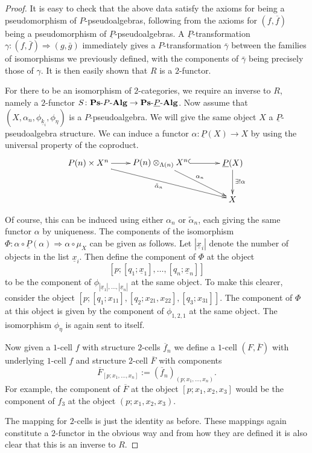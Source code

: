 \begin{proof}
It is easy to check that the above data satisfy the axioms for being a pseudomorphism of $P$-pseudoalgebras, following from the axioms for $(f,\overline{f})$ being a pseudomorphism of $\underline{P}$-pseudoalgebras. A $\underline{P}$-transformation $\gamma \colon (f, \bar{f}) \Rightarrow (g, \bar{g})$ immediately gives a $P$-transformation $\bar{\gamma}$ between the families of isomorphisms we previously defined, with the components of $\bar{\gamma}$ being precisely those of $\gamma$. It is then easily shown that $R$ is a $2$-functor.

For there to be an isomorphism of $2$-categories, we require an inverse to $R$, namely a $2$-functor $S \colon \mathbf{Ps}\mbox{-}P\mbox{-}\mathbf{Alg} \rightarrow \mathbf{Ps}\mbox{-}\underline{P}\mbox{-}\mathbf{Alg}$. Now assume that $(X, \alpha_n, \phi_{\underline{k}_i}, \phi_\eta)$ is a $P$-pseudoalgebra. We will give the same object $X$ a $\underline{P}$-pseudoalgebra structure. We can induce a functor $\alpha \colon \underline{P}(X) \rightarrow X$ by using the universal property of the coproduct.
    \[
        \xy
            (-30,0)*+{P(n) \times X^n}="-10";
            (0,0)*+{\coeq{P}{X}{\Lambda}{n}}="00";
            (30,0)*+{\underline{P}(X)}="10";
            (30,-15)*+{X}="11";
            {\ar "-10" ; "00"};
            {\ar^{\alpha_n} "00" ; "11"};
            {\ar@{^{(}->} "00" ; "10"};
            {\ar^{\exists ! \alpha} "10" ; "11"};
            {\ar_{\tilde{\alpha}_n} "-10" ; "11"};
        \endxy
    \]

Of course, this can be induced using either $\alpha_n$ or $\tilde{\alpha}_n$, each giving the same functor $\alpha$ by uniqueness. The components of the isomorphism $\Phi \colon \alpha \circ \underline{P}(\alpha) \Rightarrow \alpha \circ \mu_X$ can be given as follows. Let $\left|\underline{x}_i\right|$ denote the number of objects in the list $\underline{x}_i$. Then define the component of $\Phi$ at the object
    \[
        \left[p;\left[q_1;\underline{x}_1\right],\ldots,\left[q_n;\underline{x}_n\right]\right]
    \]
to be the component of $\phi_{\left|\underline{x}_1\right|, \ldots, |\underline{x}_n|}$ at the same object. To make this clearer, consider the object $[p;[q_1;x_{11}],[q_2;x_{21},x_{22}],[q_3;x_{31}]]$. The component of $\Phi$ at this object is given by the component of $\phi_{1,2,1}$ at the same object. The isomorphism $\phi_\eta$ is again sent to itself.

Now given a $1$-cell $f$ with structure $2$-cells $\overline{f}_n$ we define a $1$-cell $(F,\overline{F})$ with underlying $1$-cell $f$ and structure $2$-cell $\overline{F}$ with components
    \[
        \overline{F}_{[p;x_1, \ldots, x_n]} := \left(\overline{f}_{n}\right)_{(p;x_1,\ldots,x_n)}.
    \]
For example, the component of $\overline{F}$ at the object $[p;x_1,x_2,x_3]$ would be the component of $f_3$ at the object $(p;x_1,x_2,x_3)$.

The mapping for $2$-cells is just the identity as before. These mappings again constitute a $2$-functor in the obvious way and from how they are defined it is also clear that this is an inverse to $R$.
\end{proof}

